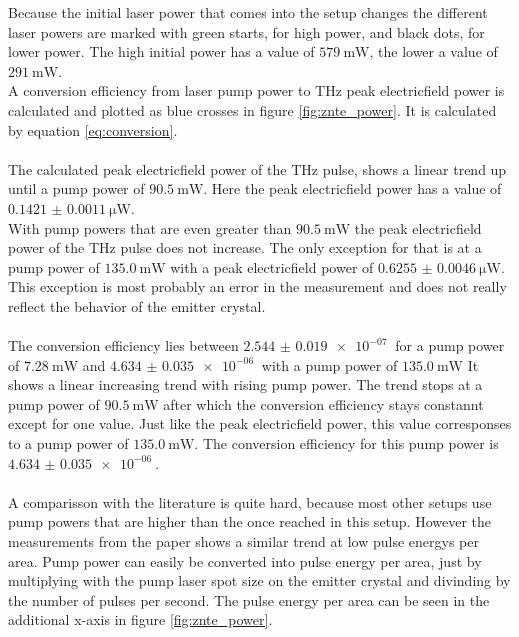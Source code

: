 Because the initial laser power that comes into the setup changes the different laser powers are marked with green starts, for high power, and black dots, for lower power.
The high initial power has a value of $\SI{579}{\milli\W}$, the lower a value of $\SI{291}{\milli\W}$.
\\
A conversion efficiency from laser pump power to $\si{\tera\hertz}$ peak electricfield power is calculated and plotted as blue crosses in figure \ref{fig:znte_power}.
It is calculated by equation \ref{eq:conversion}.
\\\\
The calculated peak electricfield power of the $\si{\tera\hertz}$ pulse, shows a linear trend up until a pump power of $\SI{90.5}{\milli\W}$.
Here the peak electricfield power has a value of $\SI{0.1421(11)}{\micro\W}$.
\\
With pump powers that are even greater than $\SI{90.5}{\milli\W}$ the peak electricfield power of the $\si{\tera\hertz}$ pulse does not increase.
The only exception for that is at a pump power of $\SI{135.0}{\milli\W}$ with a peak electricfield power of $\SI{0.6255(46)}{\micro\W}$.
This exception is most probably an error in the measurement and does not really reflect the behavior of the emitter crystal.
\\\\
The conversion efficiency lies between $\SI{2.544(19)e-07}{}$ for a pump power of $\SI{7.28}{\milli\W}$ and $\SI{4.634(35)e-06}{}$ with a pump power of $\SI{135.0}{\milli\W}$
It shows a linear increasing trend with rising pump power.
The trend stops at a pump power of $\SI{90.5}{\milli\W}$ after which the conversion efficiency stays constannt except for one value.
Just like the peak electricfield power, this value corresponses to a pump power of $\SI{135.0}{\milli\W}$.
The conversion efficiency for this pump power is $\SI{4.634(35)e-06}{}$.
\\\\
A comparisson with the literature is quite hard, because most other setups use pump powers that are higher than the once reached in this setup.
However the measurements from the paper \cite[5]{THZ_eltric_field} shows a similar trend at low pulse energys per area.
Pump power can easily be converted into pulse energy per area, just by multiplying with the pump laser spot size on the emitter crystal and divinding by the number of pulses per second.
The pulse energy per area can be seen in the additional x-axis in figure \ref{fig:znte_power}.
